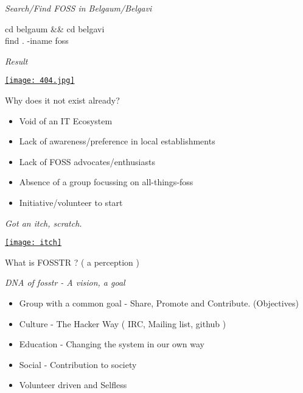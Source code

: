 \documentclass{beamer}
\begin{document}
\begin{frame}{{\textit{Search/Find FOSS in Belgaum/Belgavi}}}
\begin{center}
cd belgaum \&\& cd belgavi \\
find . -iname foss 
\end{center}
\end{frame}


\begin{frame}{{\textit{Result}}}
\begin{center}
\href{http://bit.ly/1C2Rcua}{\texttt{[image: 404.jpg]}}
\end{center}
\end{frame}

\begin{frame}{Why does it not exist already?}
\begin{center}
\begin{itemize}
\item Void of an IT Ecosystem
\item Lack of awareness/preference in local establishments
\item Lack of FOSS advocates/enthusiasts
\item Absence of a group focussing on all-things-foss
\item Initiative/volunteer to start
\end{itemize}
\end{center}
\end{frame}


\begin{frame}{\textit{Got an itch, scratch.}}
\begin{center}
\href{https://rdouglasfields.wordpress.com/2013/01/10/just-itching-to-know/}{\texttt{[image: itch]}}
\end{center}
\end{frame}


\begin{frame}{}
\begin{center}
What is FOSSTR ? ( a perception )
\end{center}
\end{frame}


\begin{frame}{\textit{ DNA of fosstr - A vision, a goal}}{}
\begin{itemize}
\item Group with a common goal - Share, Promote and Contribute. (Objectives)
\item Culture - The Hacker Way ( IRC, Mailing list, github ) 
\item Education - Changing the system in our own way
\item Social - Contribution to society
\item Volunteer driven and Selfless 
\end{itemize}
\end{frame}
\end{document}
